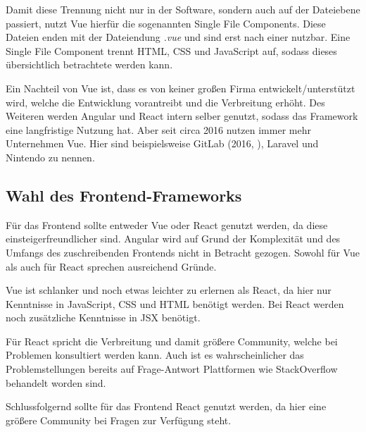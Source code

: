 Damit diese Trennung nicht nur in der Software, sondern auch auf der Dateiebene passiert, nutzt Vue hierfür die sogenannten Single File Components. Diese Dateien enden mit der Dateiendung \textit{.vue} und sind erst nach einer  nutzbar. Eine Single File Component trennt HTML, CSS und JavaScript auf, sodass dieses übersichtlich betrachtete werden kann. \cite{teufelVueJsTutorial2018a}

Ein Nachteil von Vue ist, dass es von keiner großen Firma entwickelt/unterstützt wird, welche die Entwicklung vorantreibt und die Verbreitung erhöht. Des Weiteren werden Angular und React intern selber genutzt, sodass das Framework eine langfristige Nutzung hat. Aber seit circa 2016 nutzen immer mehr Unternehmen Vue. Hier sind beispielsweise GitLab (2016, \cite{schatzWhyWeChose2016}), Laravel und Nintendo zu nennen. \cite{techuzTopWebsitesBuilt2018}

\subsection{Wahl des Frontend-Frameworks}

Für das Frontend sollte entweder Vue oder React genutzt werden, da diese einsteigerfreundlicher sind. Angular wird auf Grund der Komplexität und des Umfangs des zuschreibenden Frontends nicht in Betracht gezogen. Sowohl für Vue als auch für React sprechen ausreichend Gründe. 

Vue ist schlanker und noch etwas leichter zu erlernen als React, da hier nur Kenntnisse in JavaScript, CSS und HTML benötigt werden. Bei React werden noch zusätzliche Kenntnisse in JSX benötigt.

Für React spricht die Verbreitung und damit größere Community, welche bei Problemen konsultiert werden kann. Auch ist es wahrscheinlicher das Problemstellungen bereits auf Frage-Antwort Plattformen wie StackOverflow behandelt worden sind. 

Schlussfolgernd sollte für das Frontend React genutzt werden, da hier eine größere Community bei Fragen zur Verfügung steht.

